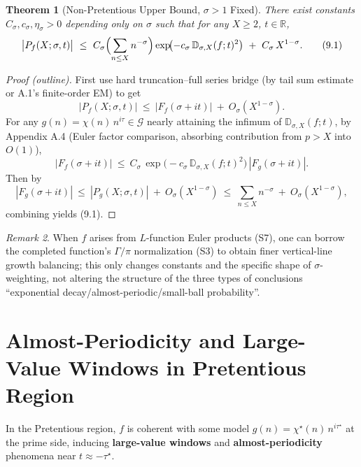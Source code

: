 \documentclass[11pt,a4paper]{article}
\newtheorem{theorem}{Theorem}[section]
\theoremstyle{remark}
\newtheorem{remark}[theorem]{Remark}
\begin{document}
\begin{theorem}[Non-Pretentious Upper Bound, $\sigma>1$ Fixed]\label{thm:non_pretentious}
There exist constants $C_\sigma,c_\sigma,\eta_\sigma>0$ depending only on $\sigma$ such that for any $X\ge2$, $t\in\mathbb{R}$,
\begin{equation}
\bigl|P_f(X;\sigma,t)\bigr|
\ \le\ C_\sigma\Bigl(\sum_{n\le X}n^{-\sigma}\Bigr)\exp\!\bigl(-c_\sigma\,\mathbb{D}_{\sigma,X}(f;t)^2\bigr)\ +\ C_\sigma\,X^{1-\sigma}.
\tag{9.1}
\end{equation}
\end{theorem}

\begin{proof}[Proof (outline)]
First use hard truncation--full series bridge (by tail sum estimate or A.1's finite-order EM) to get
\begin{equation*}
|P_f(X;\sigma,t)|\ \le\ |F_f(\sigma+it)|\ +\ O_\sigma(X^{1-\sigma}).
\end{equation*}
For any $g(n)=\chi(n)\,n^{i\tau}\in\mathcal{G}$ nearly attaining the infimum of $\mathbb{D}_{\sigma,X}(f;t)$, by Appendix A.4 (Euler factor comparison, absorbing contribution from $p>X$ into $O(1)$),
\begin{equation*}
|F_f(\sigma+it)|\ \le\ C_\sigma\,\exp\!\Big(-c_\sigma\,\mathbb{D}_{\sigma,X}(f;t)^2\Big)\,|F_g(\sigma+it)|.
\end{equation*}
Then by
\begin{equation*}
|F_g(\sigma+it)|\ \le\ |P_g(X;\sigma,t)|\ +\ O_\sigma(X^{1-\sigma})\ \le\ \sum_{n\le X}n^{-\sigma}\ +\ O_\sigma(X^{1-\sigma}),
\end{equation*}
combining yields (9.1).
\end{proof}

\begin{remark}
When $f$ arises from $L$-function Euler products (S7), one can borrow the completed function's $\Gamma/\pi$ normalization (S3) to obtain finer vertical-line growth balancing; this only changes constants and the specific shape of $\sigma$-weighting, not altering the structure of the three types of conclusions ``exponential decay/almost-periodic/small-ball probability''.
\end{remark}

\section{Almost-Periodicity and Large-Value Windows in Pretentious Region}

In the Pretentious region, $f$ is coherent with some model $g(n)=\chi^\star(n)\,n^{i\tau^\star}$ at the prime side, inducing \textbf{large-value windows} and \textbf{almost-periodicity} phenomena near $t\approx -\tau^\star$.
\end{document}
